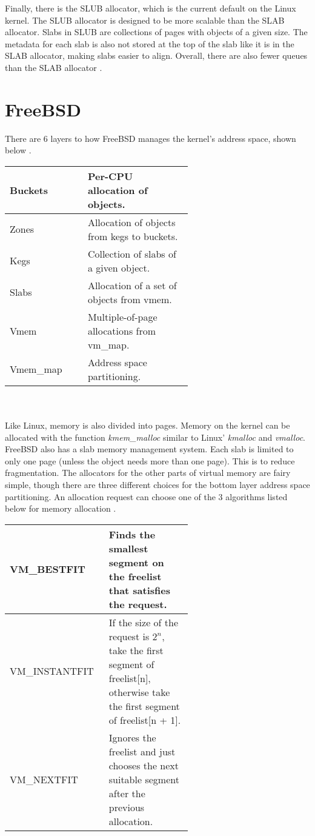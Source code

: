 \documentclass[10pt,draftclsnofoot,onecolumn,journal,compsoc]{IEEEtran}
\begin{document}
Finally, there is the SLUB allocator, which is the current default on the Linux kernel. The SLUB allocator is designed to be more scalable than the SLAB allocator. Slabs in SLUB are collections of pages with objects of a given size. The metadata for each slab is also not stored at the top of the slab like it is in the SLAB allocator, making slabs easier to align. Overall, there are also fewer queues than the SLAB allocator \cite{slub}.

\section{FreeBSD}
There are 6 layers to how FreeBSD manages the kernel's address space, shown below \cite{bsd}. \\

\begin{tabular}{ | p{0.2\linewidth} | p{0.4\linewidth} |}
    \hline
    Buckets & Per-CPU allocation of objects.\\ \hline
    Zones & Allocation of objects from kegs to buckets.\\ \hline
    Kegs & Collection of slabs of a given object.\\ \hline
    Slabs & Allocation of a set of objects from vmem. \\ \hline
    Vmem & Multiple-of-page allocations from vm\_map.\\ \hline
    Vmem\_map & Address space partitioning. \\ \hline
\end{tabular} \\ \\ 

Like Linux, memory is also divided into pages. Memory on the kernel can be allocated with the function \textit{kmem\_malloc} similar to Linux' \textit{kmalloc} and \textit{vmalloc}. FreeBSD also has a slab memory management system. Each slab is limited to only one page (unless the object needs more than one page). This is to reduce fragmentation. The allocators for the other parts of virtual memory are fairy simple, though there are three different choices for the bottom layer address space partitioning. An allocation request can choose one of the 3 algorithms listed below for memory allocation \cite{bsd}. \\

\begin{tabular}{ | p{0.2\linewidth} | p{0.4\linewidth} |}
    \hline
   VM\_BESTFIT & Finds the smallest segment on the freelist that satisfies the request. \\ \hline
    VM\_INSTANTFIT & If the size of the request is $2^{n}$, take the first segment of freelist[n], otherwise take the first segment of freelist[n + 1].  \\ \hline
    VM\_NEXTFIT & Ignores the freelist and just chooses the next suitable segment after the previous allocation. \\ \hline
\end{tabular} \\ \\ 
\end{document}
